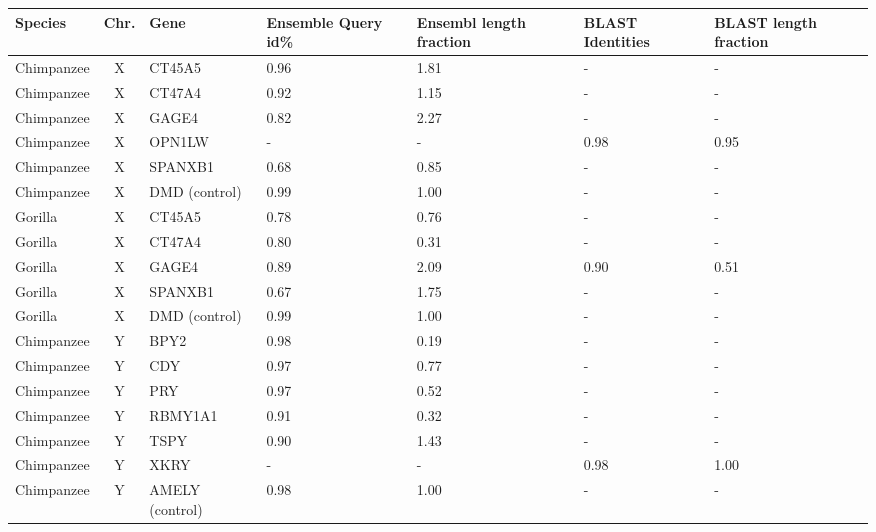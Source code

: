 \documentclass[
journal=jacsat, %
manuscript=article]{achemso}
\begin{document}
\begin{table}
\footnotesize
    \begin{center}
        \begin{tabular}{  l | c | l | p{1.8cm} | p{1.8cm} | p{1.8cm} | p{1.8cm} }
                \textbf{Species} & \textbf{Chr.} & \textbf{Gene} & \textbf{Ensemble Query id\%} & \textbf{Ensembl length fraction} & \textbf{BLAST Identities} & \textbf{BLAST length fraction} \\ 
                \hline
                    Chimpanzee & X & CT45A5 & 0.96 & 1.81 & - & - \\ 
                    Chimpanzee & X & CT47A4 & 0.92 & 1.15 & - & - \\ 
                    Chimpanzee & X & GAGE4 & 0.82 & 2.27 & - & - \\ 
                    Chimpanzee & X & OPN1LW & - & - & 0.98 & 0.95 \\ 
                    Chimpanzee & X & SPANXB1 & 0.68 & 0.85 & - & - \\ 
                    Chimpanzee & X & DMD (control) & 0.99 & 1.00 & - & - \\ 
                    \hline
                    Gorilla & X & CT45A5 & 0.78 & 0.76 & - & - \\ 
                    Gorilla & X & CT47A4 & 0.80 & 0.31 & - & - \\ 
                    Gorilla & X & GAGE4 & 0.89 & 2.09 & 0.90 & 0.51 \\ 
                    Gorilla & X & SPANXB1 & 0.67 & 1.75 & - & - \\ 
                    Gorilla & X & DMD (control) & 0.99 & 1.00 & - & - \\ 
                    \hline
                    Chimpanzee & Y & BPY2 & 0.98 & 0.19 & - & - \\ 
                    Chimpanzee & Y & CDY & 0.97 & 0.77 & - & - \\ 
                    Chimpanzee & Y & PRY & 0.97 & 0.52 & - & - \\ 
                    Chimpanzee & Y & RBMY1A1 & 0.91 & 0.32 & - & - \\ 
                    Chimpanzee & Y & TSPY & 0.90 & 1.43 & - & - \\ 
                    Chimpanzee & Y & XKRY & - & - & 0.98 & 1.00 \\ 
                    Chimpanzee & Y & AMELY (control) & 0.98 & 1.00 & - & - \\ 
        \end{tabular}

\end{center}
\end{table}
\end{document}
